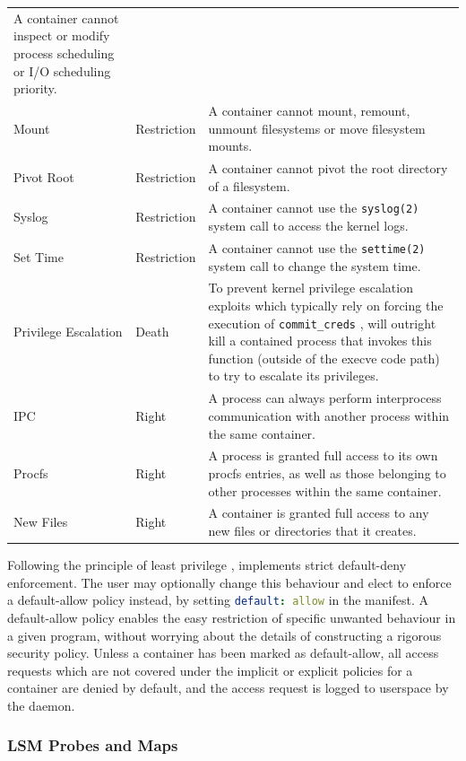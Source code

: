 \begin{longtable}[c]{llp{25em}}
    A container cannot inspect or modify process scheduling or I/O scheduling priority. \\
  Mount & Restriction &
    A container cannot mount, remount, unmount filesystems or move filesystem mounts. \\
  Pivot Root & Restriction &
    A container cannot pivot the root directory of a filesystem. \\
  Syslog & Restriction &
    A container cannot use the \texttt{syslog(2)} system call to access the kernel logs. \\
  Set Time & Restriction &
    A container cannot use the \texttt{settime(2)} system call to change the system time. \\
  \midrule
  Privilege Escalation & Death &
    To prevent kernel privilege escalation exploits which typically rely on forcing the execution of \texttt{commit\_creds} \cite{xin2018_container_security}, \bpfcontain{} will outright kill a contained process that invokes this function (outside of the execve code path) to try to escalate its privileges. \\
  \midrule
  IPC & Right &
    A process can always perform interprocess communication with another process within the same container. \\
  Procfs & Right &
    A process is granted full access to its own procfs entries, as well as those belonging to other processes within the same container. \\
  New Files & Right &
    A container is granted full access to any new files or directories that it creates. \\
  \bottomrule
\end{longtable}
\endgroup

Following the principle of least privilege \cite{saltzer1975_protection}, \bpfcontain{} implements strict default-deny enforcement. The user may optionally change this behaviour and elect to enforce a default-allow policy instead, by setting \lstinline[language=yaml]|default: allow| in the manifest. A default-allow policy enables the easy restriction of specific unwanted behaviour in a given program, without worrying about the details of constructing a rigorous security policy.  Unless a container has been marked as default-allow, all access requests which are not covered under the implicit or explicit policies for a container are denied by default, and the access request is logged to userspace by the \bpfcontain{} daemon.

\subsubsection{LSM Probes and Maps}

